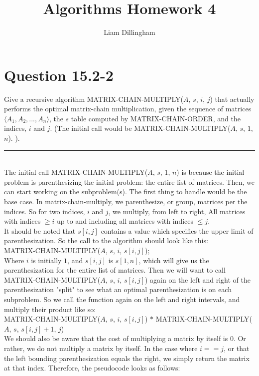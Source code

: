 \documentclass[20pt]{article} %
\title{Algorithms Homework 4}
\author{Liam Dillingham}
\begin{document}
\maketitle

\section{Question 15.2-2} 
Give a recursive algorithm MATRIX-CHAIN-MULTIPLY($A$, $s$, $i$, $j$) that actually performs the optimal matrix-chain multiplication, given the sequence of matrices $\langle A_1, A_2, ..., A_n \rangle$, the $s$ table computed  by MATRIX-CHAIN-ORDER, and the indices, $i$ and $j$. (The initial call would be MATRIX-CHAIN-MULTIPLY($A$, $s$, $1$, $n$). ). \\
\noindent\rule{2cm}{0.4pt} \\

The initial call MATRIX-CHAIN-MULTIPLY($A$, $s$, $1$, $n$) is because the initial problem is parenthesizing the initial problem: the entire list of matrices.  Then, we can start working on the subproblem(s).  The first thing to handle would be the base case.  In matrix-chain-multiply, we parenthesize, or group, matrices per the indices.  So for two indices, $i$ and $j$, we multiply, from left to right, All matrices with indices $\geq i$ up to and including all matrices with indices $\leq j$.\\ 

It should be noted that $s[i, j]$ contains a value which specifies the upper limit of parenthesization.  So the call to the algorithm should look like this: \\

MATRIX-CHAIN-MULTIPLY($A$, $s$, $i$, $s[i, j]$); \\

Where $i$ is initially $1$, and $s[i,j]$ is $s[1,n]$, which will give us the parenthesization for the entire list of matrices.  Then we will want to call MATRIX-CHAIN-MULTIPLY($A$, $s$, $i$, $s[i, j]$) again on the left and right of the parenthesization "split" to see what an optimal parenthesization is on each subproblem.  So we call the function again on the left and right intervals, and multiply their product like so: \\ 

MATRIX-CHAIN-MULTIPLY($A$, $s$, $i$, $s[i, j]$) $*$ MATRIX-CHAIN-MULTIPLY($A$, $s$, $s[i, j]+1$, $j$) \\

We should also be aware that the cost of multiplying a matrix by itself is $0$. Or rather, we do not multiply a matrix by itself. In the case where $i == j$, or that the left bounding parenthesization equals the right, we simply return the matrix at that index. Therefore, the pseudocode looks as follows:
\end{document}
